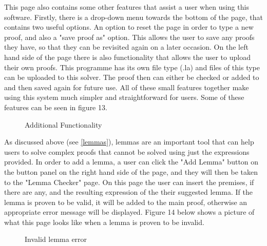 This page also contains some other features that assist a user when using this software. Firstly, there is a drop-down menu towards the bottom of the page, that contains two useful options. An option to reset the page in order to type a new proof, and also a "save proof as" option. This allows the user to save any proofs they have, so that they can be revisited again on a later occasion. On the left hand side of the page there is also functionality that allows the user to upload their own proofs. This programme has its own file type (.la) and files of this type can be uploaded to this solver. The proof then can either be checked or added to and then saved again for future use. All of these small features together make using this system much simpler and straightforward for users. Some of these features can be seen in figure 13.

\begin{figure}[!ht]
	\centering
	\caption{Additional Functionality}
\end{figure}


As discussed above (see \ref{lemmas}), lemmas are an important tool that can help users to solve complex proofs that cannot be solved using just the expressions provided. In order to add a lemma, a user can click the "Add Lemma" button on the button panel on the right hand side of the page, and they will then be taken to the "Lemma Checker" page. On this page the user can insert the premises, if there are any, and the resulting expression of the their suggested lemma. If the lemma is proven to be valid, it will be added to the main proof, otherwise an appropriate error message will be displayed. Figure 14 below shows a picture of what this page looks like when a lemma is proven to be invalid.

\begin{figure}[!ht]
	\centering
	\caption{Invalid lemma error}
\end{figure}



